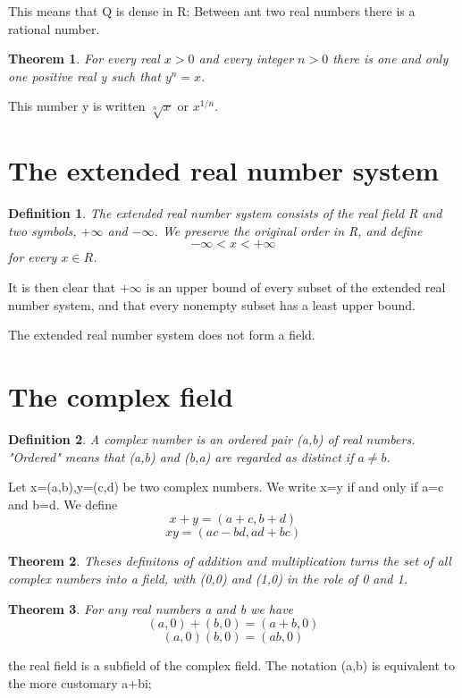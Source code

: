 \documentclass{article}
\newtheorem{defi}{Definition}
\newtheorem{theo}{Theorem}
\begin{document}
This means that Q is dense in R: Between ant two real numbers there is a rational number.

\begin{theo}
	For every real $x>0$ and every integer $n>0$ there is one and only one positive real y such that $ y^n=x $.

\end{theo}

This number y is written $ \sqrt[n]{x} $ or $ x^{1/n} $.

\section{The extended real number system}
\begin{defi}
	The extended real number system consists of the real field R and two symbols, $+\infty$ and $-\infty$. We preserve the original order in R, and define
	\[
	-\infty<x<+\infty
	\]
	for every $x\in R$.
\end{defi}

It is then clear that $+\infty$ is an upper bound of every subset of the extended real number system, and that every nonempty subset has a least upper bound.

The extended real number system does not form a field.

\section{The complex field}
\begin{defi}
	A complex number is an ordered pair (a,b) of real numbers. "Ordered" means that (a,b) and (b,a) are regarded as distinct if $a\neq b$.
\end{defi}

Let x=(a,b),y=(c,d) be two complex numbers. We write x=y if and only if a=c and b=d. We define
\[
x+y=(a+c,b+d)
\]
\[
xy=(ac-bd,ad+bc)
\]

\begin{theo}
	Theses definitons of addition and multiplication turns the set of all complex numbers into a field, with (0,0) and (1,0) in the role of 0 and 1.
\end{theo}

\begin{theo}
	For any real numbers a and b we have
\[
	(a,0)+(b,0)=(a+b,0)
\]
\[
	(a,0)(b,0)=(ab,0)
\]
\end{theo}

the real field is a subfield of the complex field. The notation (a,b) is equivalent to the more customary a+bi;
\end{document}
